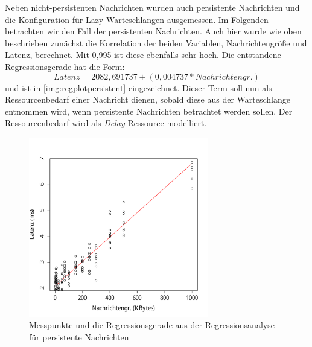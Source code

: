 \par
Neben nicht-persistenten Nachrichten wurden auch persistente Nachrichten und die Konfiguration für Lazy-Warteschlangen ausgemessen. Im Folgenden betrachten wir den Fall der persistenten Nachrichten. Auch hier wurde wie oben beschrieben zunächst die Korrelation der beiden Variablen, Nachrichtengröße und Latenz, berechnet. Mit 0,995 ist diese ebenfalls sehr hoch. Die entstandene Regressionsgerade hat die Form: \[Latenz = 2082,691737 + (0,004737 * Nachrichtengr.)\] und ist in \autoref{img:regplotpersistent} eingezeichnet. Dieser Term soll nun als Ressourcenbedarf einer Nachricht dienen, sobald diese aus der Warteschlange entnommen wird, wenn persistente Nachrichten betrachtet werden sollen. Der Ressourcenbedarf wird als \emph{Delay}-Ressource modelliert.
\begin{figure}
\center
  \includegraphics[width=0.7\textwidth]{images/modelling/persistentRegression.pdf}
  \caption{Messpunkte und die Regressionsgerade aus der Regressionsanalyse für persistente Nachrichten}
  \label{img:regplotpersistent}
\end{figure}

